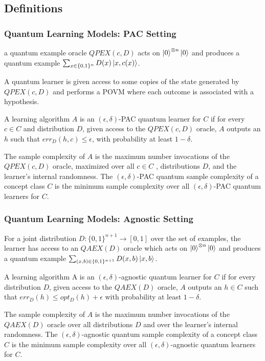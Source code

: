 \documentclass[main.tex]{subfiles}
\begin{document}
\subsection{Definitions}

\subsubsection{Quantum Learning Models: PAC Setting}

a quantum example oracle $QPEX(c,D)$ acts on $\ket{0}^{\otimes n}\ket{0}$ and produces a quantum example $\sum_{x\in\{0,1\}^n} D(x)\ket{x,c(x)}$.

A quantum learner is given access to some copies of the state generated by $QPEX(c,D)$ and performs a POVM where each outcome is associated with a hypothesis. 

A learning algorithm $A$ is an $(\epsilon, \delta)$-PAC quantum learner for $C$ if for every $c \in C$ and distribution $D$, given access to the $QPEX(c,D)$ oracle, $A$ outputs an $h$ such that $err_D (h, c) \leq \epsilon$, with probability at least $1 - \delta$.

The sample complexity of $A$ is the maximum number invocations of the $QPEX(c,D)$ oracle, maximized over all $c \in C$ , distributions $D$, and the learner’s internal randomness. The $(\epsilon, \delta)$-PAC quantum sample complexity of a concept class $C$ is the minimum sample complexity over all $(\epsilon,\delta)$-PAC quantum learners for $C$.

\subsubsection{Quantum Learning Models: Agnostic Setting}

For a joint distribution $D : \{0, 1\}^{n+1} \rightarrow [0, 1]$ over the set of examples, the learner has access to an $QAEX(D)$ oracle which acts on $\ket{0}^{\otimes n}\ket{0}$ and produces a quantum example $\sum_{(x, b)\in\{0,1\}^{n+1}} D(x,b)\ket{x,b}$. 

A learning algorithm A is an $(\epsilon, \delta)$-agnostic quantum learner for $C$ if for every distribution $D$, given access to the $QAEX(D)$ oracle, $A$ outputs an $h \in C$ such that $err_D (h) \leq opt_D(h) + \epsilon$ with probability at least $1 - \delta$.

The sample complexity of $A$ is the maximum number invocations of the $QAEX(D)$ oracle over all distributions $D$ and over the learner’s internal randomness. The $(\epsilon, \delta)$-agnostic quantum sample complexity of a concept class $C$ is the minimum sample complexity over all $(\epsilon, \delta)$-agnostic quantum learners for $C$.
\end{document}
